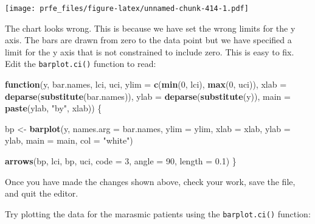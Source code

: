 \documentclass[12pt,a4paper]{book}
\newenvironment{Shaded}{\begin{snugshade}}{\end{snugshade}}
\newcommand{\KeywordTok}[1]{\textcolor[rgb]{0.13,0.29,0.53}{\textbf{#1}}}
\newcommand{\DataTypeTok}[1]{\textcolor[rgb]{0.13,0.29,0.53}{#1}}
\newcommand{\DecValTok}[1]{\textcolor[rgb]{0.00,0.00,0.81}{#1}}
\newcommand{\FloatTok}[1]{\textcolor[rgb]{0.00,0.00,0.81}{#1}}
\newcommand{\StringTok}[1]{\textcolor[rgb]{0.31,0.60,0.02}{#1}}
\newcommand{\ControlFlowTok}[1]{\textcolor[rgb]{0.13,0.29,0.53}{\textbf{#1}}}
\newcommand{\OperatorTok}[1]{\textcolor[rgb]{0.81,0.36,0.00}{\textbf{#1}}}
\newcommand{\NormalTok}[1]{#1}
\theoremstyle{definition}
\theoremstyle{definition}
\theoremstyle{definition}
\theoremstyle{remark}
\begin{document}
\texttt{[image: prfe\_files/figure-latex/unnamed-chunk-414-1.pdf]}

The chart looks wrong. This is because we have set the wrong limits for
the y axis. The bars are drawn from zero to the data point but we have
specified a limit for the y axis that is not constrained to include
zero. This is easy to fix. Edit the \texttt{barplot.ci()} function to
read:

\begin{Shaded}
\begin{Highlighting}[]
\ControlFlowTok{function}\NormalTok{(y, bar.names, lci, uci,}
         \DataTypeTok{ylim =} \KeywordTok{c}\NormalTok{(}\KeywordTok{min}\NormalTok{(}\DecValTok{0}\NormalTok{, lci), }\KeywordTok{max}\NormalTok{(}\DecValTok{0}\NormalTok{, uci)),}
         \DataTypeTok{xlab =} \KeywordTok{deparse}\NormalTok{(}\KeywordTok{substitute}\NormalTok{(bar.names)),}
         \DataTypeTok{ylab =} \KeywordTok{deparse}\NormalTok{(}\KeywordTok{substitute}\NormalTok{(y)),}
         \DataTypeTok{main =} \KeywordTok{paste}\NormalTok{(ylab, }\StringTok{"by"}\NormalTok{, xlab)) \{}

\NormalTok{  bp <-}\StringTok{ }\KeywordTok{barplot}\NormalTok{(y, }\DataTypeTok{names.arg =}\NormalTok{ bar.names,  }\DataTypeTok{ylim =}\NormalTok{ ylim, }\DataTypeTok{xlab =}\NormalTok{ xlab,}
                \DataTypeTok{ylab =}\NormalTok{ ylab, }\DataTypeTok{main =}\NormalTok{ main, }\DataTypeTok{col =} \StringTok{"white"}\NormalTok{)}
     
  \KeywordTok{arrows}\NormalTok{(bp, lci, bp, uci, }\DataTypeTok{code =} \DecValTok{3}\NormalTok{, }\DataTypeTok{angle =} \DecValTok{90}\NormalTok{, }\DataTypeTok{length =} \FloatTok{0.1}\NormalTok{)}
\NormalTok{\}}
\end{Highlighting}
\end{Shaded}

Once you have made the changes shown above, check your work, save the
file, and quit the editor.

Try plotting the data for the marasmic patients using the
\texttt{barplot.ci()} function:

\begin{Shaded}
\end{Shaded}
\end{document}
